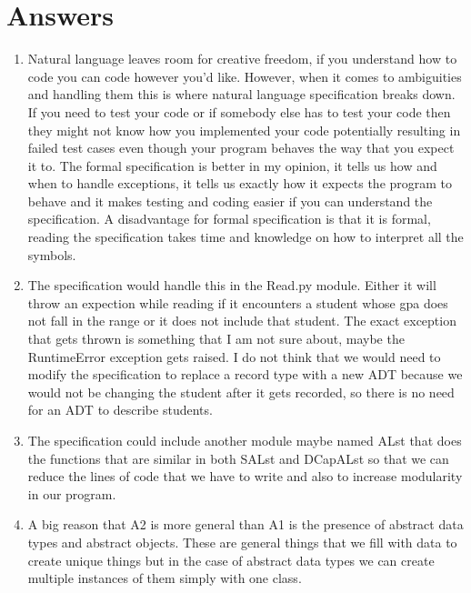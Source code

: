 \documentclass[12pt]{article}
\begin{document}
\section{Answers}

\begin{enumerate}[a]

\item Natural language leaves room for creative freedom, if you understand how to code you can code however you'd like. However, when it comes
to ambiguities and handling them this is where natural language specification breaks down. If you need to test your code or if somebody else 
has to test your code then they might not know how you implemented your code potentially resulting in failed test cases even though your 
program behaves the way that you expect it to. The formal specification is better in my opinion, it tells us how and when to handle exceptions,
it tells us exactly how it expects the program to behave and it makes testing and coding easier if you can understand the specification. A
disadvantage for formal specification is that it is formal, reading the specification takes time and knowledge on how to interpret all the
symbols. 

\item The specification would handle this in the Read.py module. Either it will throw an expection while reading if it encounters a student
whose gpa does not fall in the range or it does not include that student. The exact exception that gets thrown is something that I am not 
sure about, maybe the RuntimeError exception gets raised. I do not think that we would need to modify the specification to replace a record
type with a new ADT because we would not be changing the student after it gets recorded, so there is no need for an ADT to describe students.

\item The specification could include another module maybe named ALst that does the functions that are similar in both SALst and DCapALst
so that we can reduce the lines of code that we have to write and also to increase modularity in our program. 

\item A big reason that A2 is more general than A1 is the presence of abstract data types and abstract objects. These are general things that 
we fill with data to create unique things but in the case of abstract data types we can create multiple instances of them simply with one 
class.  


\end{enumerate}
\end{document}
